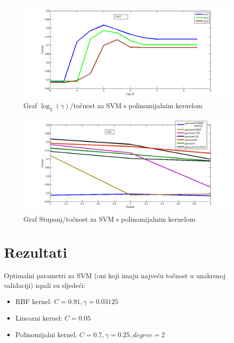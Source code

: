 \documentclass[conference]{IEEEtran}
\begin{document}
\begin{figure}[H]
\begin{minipage}{0.5\textwidth}
\centering
\includegraphics[width=\textwidth]{images/paramGammaPoly.png}
\caption{Graf $\log _2(\gamma )$/točnost za SVM s polinomijalnim kernelom}
\end{minipage}
\end{figure}

\begin{figure}[H]
\begin{minipage}{0.5\textwidth}
\centering
\includegraphics[width=\textwidth]{images/paramDegreePoly.png}
\caption{Graf Stupanj/točnost za SVM s polinomijalnim kernelom}
\end{minipage}
\end{figure}

\section{Rezultati}

Optimalni parametri za SVM (oni koji imaju najveću točnost u unakrsnoj
validaciji) ispali su sljedeći:

\begin{itemize}
  \item RBF kernel: $C=0.91, \gamma =0.03125$
  \item Linearni kernel: $C=0.05$
  \item Polinomijalni kernel: $C=0.7, \gamma =0.25, degree=2$
\end{itemize}
\end{document}
